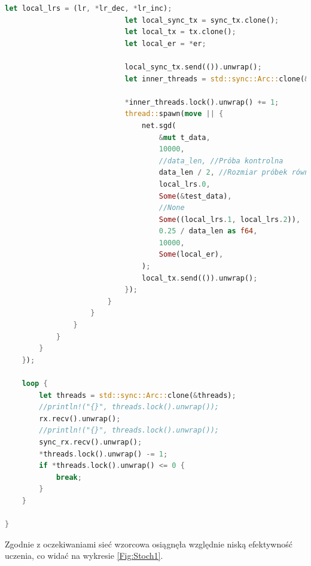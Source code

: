 \documentclass[12pt,twoside]{article}
\begin{document}
\begin{lstlisting}[language=Rust,caption=Kod wykorzystany do przeprowadzenia 3 serii eksperymentów,label={lst:test3}]
                            let local_lrs = (lr, *lr_dec, *lr_inc);
                            let local_sync_tx = sync_tx.clone();
                            let local_tx = tx.clone();
                            let local_er = *er;

                            local_sync_tx.send(()).unwrap();
                            let inner_threads = std::sync::Arc::clone(&tmp_threads);

                            *inner_threads.lock().unwrap() += 1;
                            thread::spawn(move || {
                                net.sgd(
                                    &mut t_data,
                                    10000,
                                    //data_len, //Próba kontrolna
                                    data_len / 2, //Rozmiar próbek równy połowie długości całego zbioru uczącego
                                    local_lrs.0,
                                    Some(&test_data),
                                    //None
                                    Some((local_lrs.1, local_lrs.2)),
                                    0.25 / data_len as f64,
                                    10000,
                                    Some(local_er),
                                );
                                local_tx.send(()).unwrap();
                            });
                        }
                    }
                }
            }
        }
    });

    loop {
        let threads = std::sync::Arc::clone(&threads);
        //println!("{}", threads.lock().unwrap());
        rx.recv().unwrap();
        //println!("{}", threads.lock().unwrap());
        sync_rx.recv().unwrap();
        *threads.lock().unwrap() -= 1;
        if *threads.lock().unwrap() <= 0 {
            break;
        }
    }

}
\end{lstlisting}

Zgodnie z oczekiwaniami sieć wzorcowa osiągnęła względnie niską efektywność uczenia, co widać na wykresie \ref{Fig:Stoch1}.
\end{document}
